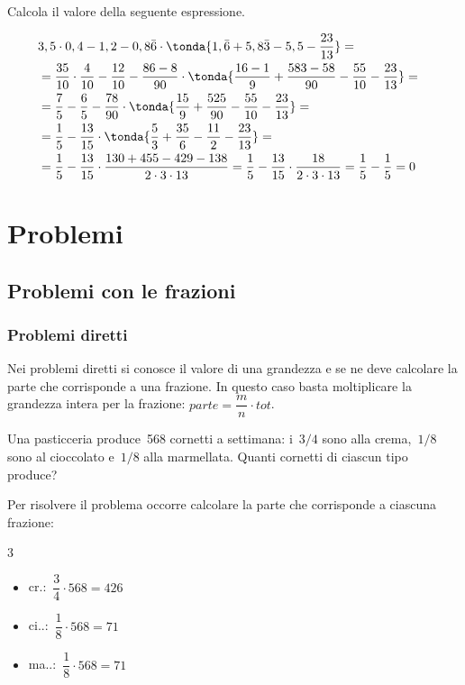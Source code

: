 \pagebreak %

\begin{esempio}{}{}
Calcola il valore della seguente espressione.

\begin{align*}
&3,5 \cdot 0,4-1,2-0,8\bar{6} \cdot \tonda{
   1,\bar{6}+5,8\bar{3}-5,5-\frac{23}{13}
}=&\\
&=\frac{35}{10} \cdot \frac{4}{10}-\frac{12}{10}-
 \frac{86-8}{90} \cdot \tonda{
   \frac{16-1}{9} + \frac{583-58}{90} - \frac{55}{10} - \frac{23}{13}
 }=\\
&=\frac{7}{5}-\frac{6}{5}-
 \frac{78}{90} \cdot \tonda{
   \frac{15}{9} + \frac{525}{90} - \frac{55}{10} - \frac{23}{13}
 }=\\
&=\frac{1}{5}-
 \frac{13}{15} \cdot \tonda{
   \frac{5}{3} + \frac{35}{6} - \frac{11}{2} - \frac{23}{13}
 }=\\
&=\frac{1}{5}-
 \frac{13}{15} \cdot
   \frac{130+455-429-138}{2 \cdot 3 \cdot 13} =
 \frac{1}{5} - \frac{13}{15} \cdot \frac{18}{2 \cdot 3 \cdot 13}=
\frac{1}{5} - \frac{1}{5} = 0
\end{align*}

\end{esempio}


\section{Problemi}
\label{sec:razionali_problemi}


\subsection{Problemi con le frazioni}

\subsubsection{Problemi diretti}
Nei problemi diretti si conosce il valore di una grandezza e se ne deve 
calcolare la parte che corrisponde a una frazione. 
In questo caso basta moltiplicare la grandezza intera per la frazione: 
\quad \(parte = \dfrac{m}{n} \cdot tot\).

 \begin{esempio}{}{}
Una pasticceria produce~568 cornetti a settimana: i~\(3/4\) sono alla 
crema,~\(1/8\) sono al cioccolato e~\(1/8\) alla marmellata. 
Quanti cornetti di ciascun tipo produce?

Per risolvere il problema occorre calcolare la parte che corrisponde a 
ciascuna frazione:

\begin{htmulticols}{3}
\begin{itemize} [noitemsep]
\item cr.:~\(\dfrac{3}{4} \cdot 568 =426\)
\item ci..:~\(\dfrac{1}{8} \cdot 568 =71\)
\item ma..:~\(\dfrac{1}{8} \cdot 568 =71\)
\end{itemize}
\end{htmulticols}
 \end{esempio}



